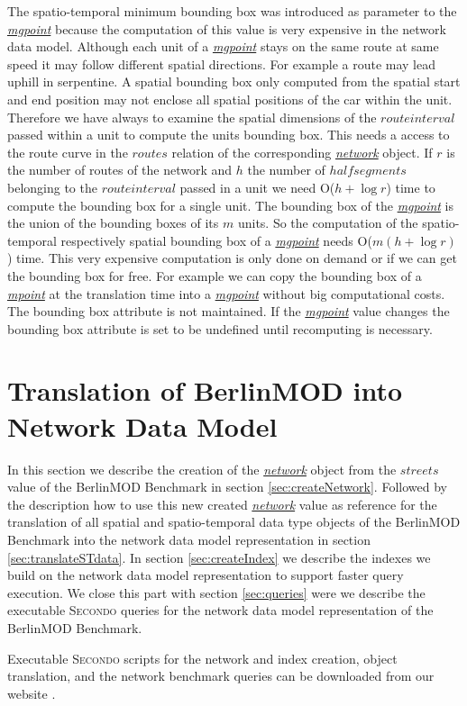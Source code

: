 \documentclass[a4paper]{article}
\newcommand{\secondo}{\textsc{Secondo}}
\newcommand{\bmodb} {BerlinMOD Benchmark}
\newcommand{\dt}[1]{\textsl{\underline{#1}}}
\begin{document}
{The spatio-temporal minimum bounding box was introduced as parameter to the
\dt{mgpoint} because the computation of this value is very expensive in the
network data model. Although each unit of a \dt{mgpoint} stays on the same route
at same speed it may follow different spatial directions. For example a route may
lead uphill in serpentine. A spatial bounding box only computed from the spatial
start and end position may not enclose all spatial positions of the car within
the unit. Therefore we have always to examine the spatial dimensions of the
$route interval$ passed within a unit to compute the units bounding box. This
needs a access to the route curve in the $routes$ relation of the corresponding
\dt{network} object. If $r$ is the number of routes
of the network and $h$ the number of $half segments$ belonging to the $route interval$
passed in a unit we need O($h + \log r$) time to
compute the bounding box for a single unit. The bounding box of the \dt{mgpoint}
is the union of the bounding boxes of its $m$ units. So the computation of the
spatio-temporal respectively spatial bounding box of a \dt{mgpoint} needs
O($m(h + \log r)$) time. This very expensive computation is only done
on demand or if we can get the bounding box for free. For example we can copy
the bounding box of a \dt{mpoint} at the translation time into a \dt{mgpoint}
without big computational costs. The bounding box attribute is not maintained. If
the \dt{mgpoint} value changes the bounding box attribute is set to be undefined
until recomputing is necessary.
\section{Translation of BerlinMOD into Network Data Model}
\label{sec:Translation}
In this section we describe the creation of the \dt{network} object from the $streets$
value of the \bmodb{} in section \ref{sec:createNetwork}. Followed by the
description how to use this new created \dt{network} value as reference for the
translation of all spatial and spatio-temporal data type objects of the \bmodb{}
into the network data model representation in section \ref{sec:translateSTdata}.
In section \ref{sec:createIndex} we describe the indexes we build on the network
data model representation to support faster query execution. We close this part
with section \ref{sec:queries} were we describe the executable \secondo{} queries
for the network data model representation of the \bmodb{}.

Executable \secondo{} scripts for the network and index creation, object translation,
and the network benchmark queries can be downloaded from our website
\cite{berlinmodweb}.
}
\end{document}
